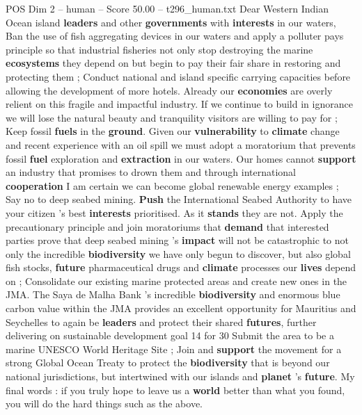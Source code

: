 \begin{textsample}{POS Dim 2 – human – Score 50.00 – t296\_human.txt}  \label{ex:f2_pos_030}
Dear Western Indian Ocean island \textbf{leaders} and other \textbf{governments} with \textbf{interests} in our waters, Ban the use of fish aggregating devices in our waters and apply a polluter pays principle so that industrial fisheries not only stop destroying the marine \textbf{ecosystems} they depend on but begin to pay their fair share in restoring and protecting them ; Conduct national and island specific carrying capacities before allowing the development of more hotels.
Already our \textbf{economies} are overly relient on this fragile and impactful industry.
If we continue to build in ignorance we will lose the natural beauty and tranquility visitors are willing to pay for ; Keep fossil \textbf{fuels} in the \textbf{ground}.
Given our \textbf{vulnerability} to \textbf{climate} change and recent experience with an oil spill we must adopt a moratorium that prevents fossil \textbf{fuel} exploration and \textbf{extraction} in our waters.
Our homes cannot \textbf{support} an industry that promises to drown them and through international \textbf{cooperation} I am certain we can become global renewable energy examples ; Say no to deep seabed mining. \textbf{Push} the International Seabed Authority to have your citizen ’s best \textbf{interests} prioritised.
As it \textbf{stands} they are not.
Apply the precautionary principle and join moratoriums that \textbf{demand} that interested parties prove that deep seabed mining ’s \textbf{impact} will not be catastrophic to not only the incredible \textbf{biodiversity} we have only begun to discover, but also global fish stocks, \textbf{future} pharmaceutical drugs and \textbf{climate} processes our \textbf{lives} depend on ; Consolidate our existing marine protected areas and create new ones in the JMA.
The Saya de Malha Bank ’s incredible \textbf{biodiversity} and enormous blue carbon value within the JMA provides an excellent opportunity for Mauritius and Seychelles to again be \textbf{leaders} and protect their shared \textbf{futures}, further delivering on sustainable development goal 14 for 30 %
Submit the area to be a marine UNESCO World Heritage Site ; Join and \textbf{support} the movement for a strong Global Ocean Treaty to protect the \textbf{biodiversity} that is beyond our national jurisdictions, but intertwined with our islands and \textbf{planet} ’s \textbf{future}.
My final words : if you truly hope to leave us a \textbf{world} better than what you found, you will do the hard things such as the above.

\end{textsample}
